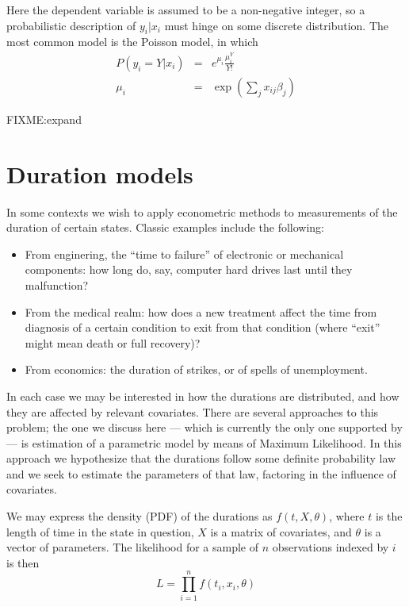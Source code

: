 Here the dependent variable is assumed to be a non-negative integer,
so a probabilistic description of $y_i | x_i$ must hinge on some
discrete distribution. The most common model is the Poisson model, in
which
\begin{eqnarray*}
  P(y_i = Y | x_i) & = & e^{\mu_i} \frac{\mu_i^Y}{Y!} \\
  \mu_i & = & \exp\left( \sum_j x_{ij} \beta_j \right)
\end{eqnarray*}

FIXME:expand

\section{Duration models}
\label{sec:duration}

In some contexts we wish to apply econometric methods to measurements
of the duration of certain states. Classic examples include the
following:
\begin{itemize}
\item From enginering, the ``time to failure'' of electronic or
  mechanical components: how long do, say, computer hard drives
  last until they malfunction?
\item From the medical realm: how does a new treatment affect the
  time from diagnosis of a certain condition to exit from that
  condition (where ``exit'' might mean death or full recovery)?
\item From economics: the duration of strikes, or of spells of
  unemployment.
\end{itemize}

In each case we may be interested in how the durations are
distributed, and how they are affected by relevant covariates.  There
are several approaches to this problem; the one we discuss here ---
which is currently the only one supported by  --- is
estimation of a parametric model by means of Maximum Likelihood.  In
this approach we hypothesize that the durations follow some definite
probability law and we seek to estimate the parameters of that law,
factoring in the influence of covariates. 

We may express the density (PDF) of the durations as $f(t, X,
\theta)$, where $t$ is the length of time in the state in question,
$X$ is a matrix of covariates, and $\theta$ is a vector of parameters.
The likelihood for a sample of $n$ observations indexed by $i$ is then
\[
L = \prod_{i=1}^n f(t_i, x_i, \theta)
\]

